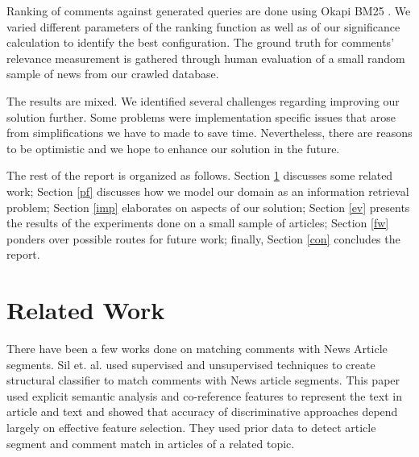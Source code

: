\documentclass[article]{IEEEtran}
\begin{document}
Ranking of comments against generated queries are done using Okapi BM25 \cite{Robertson96okapiat}. We varied different parameters of the ranking function as well as of our significance calculation to identify the best configuration. The ground truth for comments' relevance measurement is gathered through human evaluation of a small random sample of news from our crawled database.

The results are mixed. We identified several challenges regarding improving our solution further. Some problems were implementation specific issues that arose from simplifications we have to made to save time. Nevertheless, there are reasons to be optimistic and we hope to enhance our solution in the future.

The rest of the report is organized as follows. Section \ref{rw} discusses some related work; Section \ref{pf} discusses how we model our domain as an information retrieval problem; Section \ref{imp} elaborates on aspects of our solution; Section \ref{ev} presents the results of the experiments done on a small sample of articles; Section \ref{fw} ponders over possible routes for future work; finally, Section \ref{con} concludes the report.                

\section{Related Work}
\label{rw}
There have been a few works done on matching comments with News Article segments. Sil et. al. \cite{Sil:2011:SMC:2063576.2063906} used supervised and unsupervised techniques to create structural classifier to match comments with News article segments. This paper used explicit semantic analysis and co-reference features to represent the text in article and text and showed that accuracy of discriminative approaches depend largely on effective feature selection. They used prior data to detect article segment and comment match in articles of a related topic.
\end{document}

